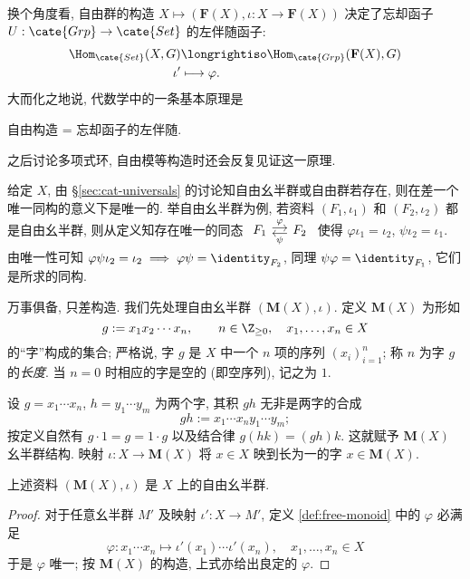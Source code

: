 \begin{remark}
	换个角度看, 自由群的构造 $X \mapsto (\mathbf{F}(X), \iota: X \to \mathbf{F}(X))$ 决定了忘却函子 $U: \cate{Grp} \to \cate{Set}$ 的左伴随函子:
	\begin{align*}
		\Hom_\cate{Set}(X, G) & \longrightiso \Hom_\cate{Grp}(\mathbf{F}(X), G) \\
		\iota' & \longmapsto \varphi.
	\end{align*}
	大而化之地说, 代数学中的一条基本原理是
	\begin{center}
		自由构造 = 忘却函子的左伴随.
	\end{center}
	之后讨论多项式环, 自由模等构造时还会反复见证这一原理.
\end{remark}
给定 $X$, 由 \S\ref{sec:cat-universals} 的讨论知自由幺半群或自由群若存在, 则在差一个唯一同构的意义下是唯一的. 举自由幺半群为例, 若资料 $(F_1, \iota_1)$ 和 $(F_2, \iota_2)$ 都是自由幺半群, 则从定义知存在唯一的同态 $\begin{tikzcd}[column sep=small] F_1 \arrow[r, yshift=0.5ex, "\varphi"] & F_2 \arrow[l, yshift=-0.5ex, "\psi"] \end{tikzcd}$ 使得 $\varphi \iota_1 =\iota_2$, $\psi \iota_2 = \iota_1$. 由唯一性可知 $ \varphi\psi \iota_2 = \iota_2 \implies \varphi\psi = \identity_{F_2}$, 同理 $\psi\varphi = \identity_{F_1}$, 它们是所求的同构.

万事俱备, 只差构造. 我们先处理自由幺半群 $(\mathbf{M}(X), \iota)$. 定义 $\mathbf{M}(X)$ 为形如
\[ g := x_1 x_2  \cdots x_n, \qquad n \in \Z_{\geq 0}, \quad x_1, \ldots, x_n \in X \]
的``字''构成的集合; 严格说, 字 $g$ 是 $X$ 中一个 $n$ 项的序列 $(x_i)_{i=1}^n$; 称 $n$ 为字 $g$ 的\emph{长度}. 当 $n=0$ 时相应的字是空的 (即空序列), 记之为 $1$.

设 $g = x_1 \cdots x_n$, $h = y_1 \cdots y_m$ 为两个字, 其积 $gh$ 无非是两字的合成
\[ gh := x_1 \cdots x_n y_1 \cdots y_m; \]
按定义自然有 $g \cdot 1 = g = 1 \cdot g$ 以及结合律 $g(hk) = (gh)k$. 这就赋予 $\mathbf{M}(X)$ 幺半群结构. 映射 $\iota: X \to \mathbf{M}(X)$ 将 $x \in X$ 映到长为一的字 $x \in \mathbf{M}(X)$.

\begin{lemma}
	上述资料 $(\mathbf{M}(X), \iota)$ 是 $X$ 上的自由幺半群.
\end{lemma}
\begin{proof}
	对于任意幺半群 $M'$ 及映射 $\iota': X \to M'$, 定义 \ref{def:free-monoid} 中的 $\varphi$ 必满足
	\[ \varphi: x_1 \cdots x_n \longmapsto \iota'(x_1) \cdots \iota'(x_n), \quad x_1, \ldots, x_n \in X \]
	于是 $\varphi$ 唯一; 按 $\mathbf{M}(X)$ 的构造, 上式亦给出良定的 $\varphi$.
\end{proof}

